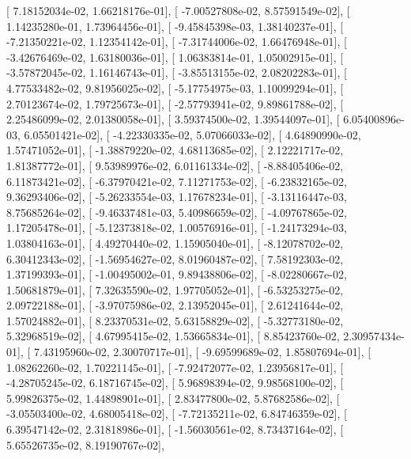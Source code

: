 \documentclass{article}
\begin{document}
       [  7.18152034e-02,   1.66218176e-01],
       [ -7.00527808e-02,   8.57591549e-02],
       [  1.14235280e-01,   1.73964456e-01],
       [ -9.45845398e-03,   1.38140237e-01],
       [ -7.21350221e-02,   1.12354142e-01],
       [ -7.31744006e-02,   1.66476948e-01],
       [ -3.42676469e-02,   1.63180036e-01],
       [  1.06383814e-01,   1.05002915e-01],
       [ -3.57872045e-02,   1.16146743e-01],
       [ -3.85513155e-02,   2.08202283e-01],
       [  4.77533482e-02,   9.81956025e-02],
       [ -5.17754975e-03,   1.10099294e-01],
       [  2.70123674e-02,   1.79725673e-01],
       [ -2.57793941e-02,   9.89861788e-02],
       [  2.25486099e-02,   2.01380058e-01],
       [  3.59374500e-02,   1.39544097e-01],
       [  6.05400896e-03,   6.05501421e-02],
       [ -4.22330335e-02,   5.07066033e-02],
       [  4.64890990e-02,   1.57471052e-01],
       [ -1.38879220e-02,   4.68113685e-02],
       [  2.12221717e-02,   1.81387772e-01],
       [  9.53989976e-02,   6.01161334e-02],
       [ -8.88405406e-02,   6.11873421e-02],
       [ -6.37970421e-02,   7.11271753e-02],
       [ -6.23832165e-02,   9.36293406e-02],
       [ -5.26233554e-03,   1.17678234e-01],
       [ -3.13116447e-03,   8.75685264e-02],
       [ -9.46337481e-03,   5.40986659e-02],
       [ -4.09767865e-02,   1.17205478e-01],
       [ -5.12373818e-02,   1.00576916e-01],
       [ -1.24173294e-03,   1.03804163e-01],
       [  4.49270440e-02,   1.15905040e-01],
       [ -8.12078702e-02,   6.30412343e-02],
       [ -1.56954627e-02,   8.01960487e-02],
       [  7.58192303e-02,   1.37199393e-01],
       [ -1.00495002e-01,   9.89438806e-02],
       [ -8.02280667e-02,   1.50681879e-01],
       [  7.32635590e-02,   1.97705052e-01],
       [ -6.53253275e-02,   2.09722188e-01],
       [ -3.97075986e-02,   2.13952045e-01],
       [  2.61241644e-02,   1.57024882e-01],
       [  8.23370531e-02,   5.63158829e-02],
       [ -5.32773180e-02,   5.32968519e-02],
       [  4.67995415e-02,   1.53665834e-01],
       [  8.85423760e-02,   2.30957434e-01],
       [  7.43195960e-02,   2.30070717e-01],
       [ -9.69599689e-02,   1.85807694e-01],
       [  1.08262260e-02,   1.70221145e-01],
       [ -7.92472077e-02,   1.23956817e-01],
       [ -4.28705245e-02,   6.18716745e-02],
       [  5.96898394e-02,   9.98568100e-02],
       [  5.99826375e-02,   1.44898901e-01],
       [  2.83477800e-02,   5.87682586e-02],
       [ -3.05503400e-02,   4.68005418e-02],
       [ -7.72135211e-02,   6.84746359e-02],
       [  6.39547142e-02,   2.31818986e-01],
       [ -1.56030561e-02,   8.73437164e-02],
       [  5.65526735e-02,   8.19190767e-02],
\end{document}
